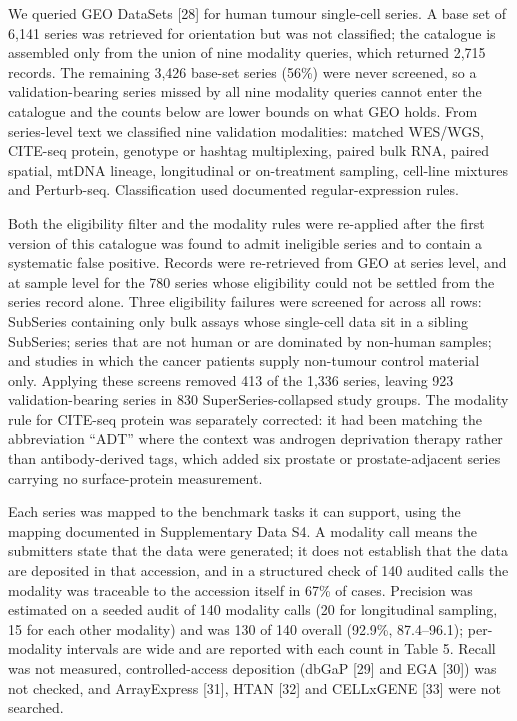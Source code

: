 \documentclass{article}
\begin{document}
We queried GEO DataSets {[}28{]} for human tumour single-cell series. A
base set of 6,141 series was retrieved for orientation but was not
classified; the catalogue is assembled only from the union of nine
modality queries, which returned 2,715 records. The remaining 3,426
base-set series (56\%) were never screened, so a validation-bearing
series missed by all nine modality queries cannot enter the catalogue
and the counts below are lower bounds on what GEO holds. From
series-level text we classified nine validation modalities: matched
WES/WGS, CITE-seq protein, genotype or hashtag multiplexing, paired bulk
RNA, paired spatial, mtDNA lineage, longitudinal or on-treatment
sampling, cell-line mixtures and Perturb-seq. Classification used
documented regular-expression rules.

Both the eligibility filter and the modality rules were re-applied after
the first version of this catalogue was found to admit ineligible series
and to contain a systematic false positive. Records were re-retrieved
from GEO at series level, and at sample level for the 780 series whose
eligibility could not be settled from the series record alone. Three
eligibility failures were screened for across all rows: SubSeries
containing only bulk assays whose single-cell data sit in a sibling
SubSeries; series that are not human or are dominated by non-human
samples; and studies in which the cancer patients supply non-tumour
control material only. Applying these screens removed 413 of the 1,336
series, leaving 923 validation-bearing series in 830
SuperSeries-collapsed study groups. The modality rule for CITE-seq
protein was separately corrected: it had been matching the abbreviation
``ADT'' where the context was androgen deprivation therapy rather than
antibody-derived tags, which added six prostate or prostate-adjacent
series carrying no surface-protein measurement.

Each series was mapped to the benchmark tasks it can support, using the
mapping documented in Supplementary Data S4. A modality call means the
submitters state that the data were generated; it does not establish
that the data are deposited in that accession, and in a structured check
of 140 audited calls the modality was traceable to the accession itself
in 67\% of cases. Precision was estimated on a seeded audit of 140
modality calls (20 for longitudinal sampling, 15 for each other
modality) and was 130 of 140 overall (92.9\%, 87.4--96.1); per-modality
intervals are wide and are reported with each count in Table 5. Recall
was not measured, controlled-access deposition (dbGaP {[}29{]} and EGA
{[}30{]}) was not checked, and ArrayExpress {[}31{]}, HTAN {[}32{]} and
CELLxGENE {[}33{]} were not searched.
\end{document}
